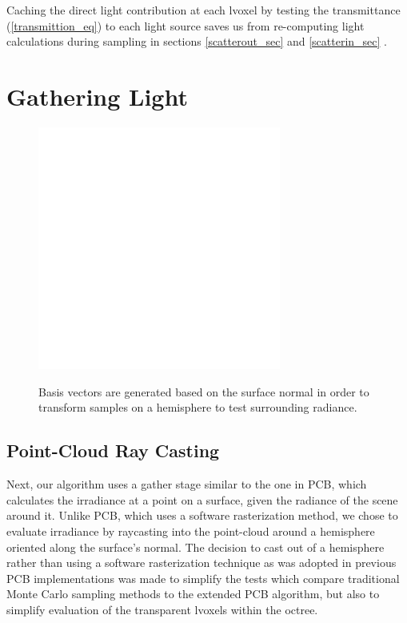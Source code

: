 \documentclass[12pt]{ucthesis}
\newcommand{\captionfonts}{\small\bf\ssp}
\begin{document}
Caching the direct light contribution at each lvoxel by testing the transmittance (\ref{transmittion_eq}) to each light source saves us from re-computing light calculations during sampling in sections \ref{scatterout_sec} and \ref{scatterin_sec} \cite{signotes:2010}.

\section{Gathering Light}

\begin{figure}[h!]
    \centering
    \includegraphics[width=80mm]{img/diag/orthnormal.pdf}
    \captionfonts
    \caption{Basis vectors are generated based on the surface normal in order to transform samples on a hemisphere to test surrounding radiance.}
    \label{fig:orthonormal}
\end{figure}

\subsection{Point-Cloud Ray Casting}

Next, our algorithm uses a gather stage similar to the one in PCB, which calculates the irradiance at a point on a surface, given the radiance of the scene around it.  Unlike PCB, which uses a software rasterization method, we chose to evaluate irradiance by raycasting into the point-cloud around a hemisphere oriented along the surface's normal.  The decision to cast out of a hemisphere rather than using a software rasterization technique as was adopted in previous PCB implementations was made to simplify the tests which compare traditional Monte Carlo sampling methods to the extended PCB algorithm, but also to simplify evaluation of the transparent lvoxels within the octree.
\end{document}
